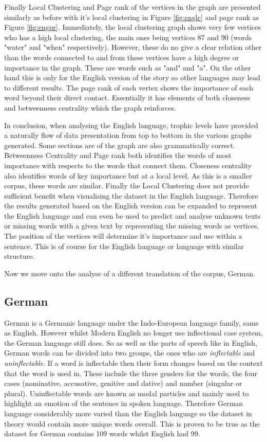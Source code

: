 Finally Local Clustering and Page rank of the vertices in the graph are presented similarly as before with it's local clustering in Figure \ref{fig:englc} and page rank as Figure \ref{fig:engpr}. Immediately, the local clustering graph shows very few vertices who has a high local clustering, the main ones being vertices 87 and 90 (words "water" and "when" respectively). However, these do no give a clear relation other than the words connected to and from these vertices have a high degree or importance in the graph. These are words such as "and" and "a". On the other hand this is only for the English version of the story so other languages may lead to different results. The page rank of each vertex shows the importance of each word beyond their direct contact. Essentially it has elements of both closeness and betweenness centrality which the graph reinforces.

In conclusion, when analysing the English language, trophic levels have provided a naturally flow of data presentation from top to bottom in the various graphs generated. Some sections are of the graph are also grammatically correct. Betweenness Centrality and Page rank both identifies the words of most importance with respects to the words that connect them. Closeness centrality also identifies words of key importance but at a local level. As this is a smaller corpus, these words are similar. Finally the Local Clustering does not provide sufficient benefit when visualising the dataset in the English language. Therefore the results generated based on the English version can be expanded to represent the English language and can even be used to predict and analyse unknown texts or missing words with a given text by representing the missing words as vertices. The position of the vertices will determine it's importance and use within a sentence. This is of course for the English language or language with similar structure.

Now we move onto the analyse of a different translation of the corpus, German.

\subsection{German}
German is a Germanic language under the Indo-European language family, same as English. However whilst Modern English no longer use inflectional case system, the German language still does\cite{durrell2011hammer}. So as well as the parts of speech like in English, German words can be divided into two groups, the ones who are \emph{inflectable} and \emph{uninflectable}. If a word is inflectable then their form changes based on the context that the word is used in. These include the three genders for the words, the four cases (nominative, accusative, genitive and dative) and number (singular or plural). Uninflectable words are known as modal particles and mainly used to highlight an emotion of the sentence in spoken language. Therefore German language considerably more varied than the English language so the dataset in theory would contain more unique words overall. This is proven to be true as the dataset for German contains 109 words whilst English had 99.

